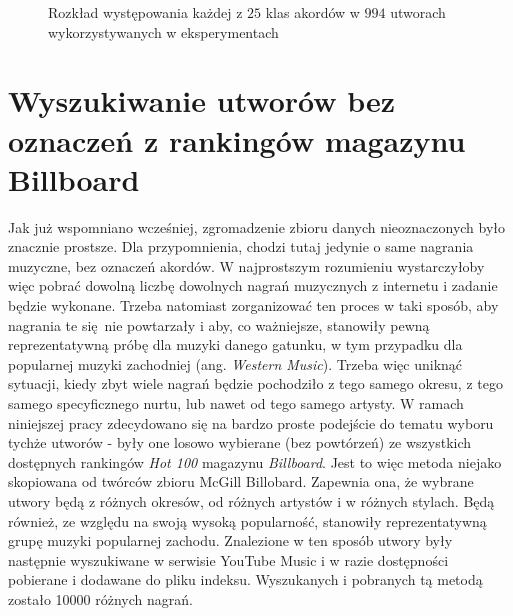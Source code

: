 \begin{figure}
    \centering
    \caption{Rozkład występowania każdej z $25$ klas akordów w $994$ utworach wykorzystywanych w eksperymentach}
    \label{fig:chords_histogram}
\end{figure}


\section{Wyszukiwanie utworów bez oznaczeń z rankingów magazynu Billboard}

Jak już wspomniano wcześniej, zgromadzenie zbioru danych nieoznaczonych było znacznie prostsze. Dla
przypomnienia, chodzi tutaj jedynie o same nagrania muzyczne, bez oznaczeń akordów. W najprostszym
rozumieniu wystarczyłoby więc pobrać dowolną liczbę dowolnych nagrań muzycznych z internetu i
zadanie będzie wykonane. Trzeba natomiast zorganizować ten proces w taki sposób, aby nagrania te
się nie powtarzały i aby, co ważniejsze, stanowiły pewną reprezentatywną próbę dla muzyki danego
gatunku, w tym przypadku dla popularnej muzyki zachodniej (ang. \emph{Western Music}). Trzeba więc
uniknąć sytuacji, kiedy zbyt wiele nagrań będzie pochodziło z tego samego okresu, z tego samego
specyficznego nurtu, lub nawet od tego samego artysty. W ramach niniejszej pracy zdecydowano się na
bardzo proste podejście do tematu wyboru tychże utworów - były one losowo wybierane (bez powtórzeń)
ze wszystkich dostępnych rankingów \emph{Hot 100} magazynu \emph{Billboard}. Jest to więc metoda
niejako skopiowana od twórców zbioru McGill Billobard. Zapewnia ona, że wybrane utwory będą z
różnych okresów, od różnych artystów i w różnych stylach. Będą również, ze względu na swoją wysoką
popularność, stanowiły reprezentatywną grupę muzyki popularnej zachodu. Znalezione w ten sposób
utwory były następnie wyszukiwane w serwisie YouTube Music i w razie dostępności pobierane i
dodawane do pliku indeksu. Wyszukanych i pobranych tą metodą zostało 10000 różnych nagrań.

